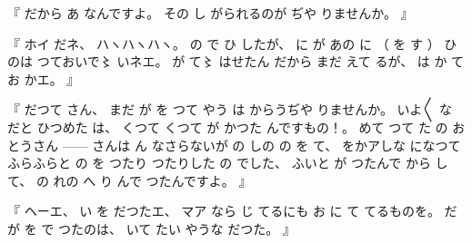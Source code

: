 %
『
だから
あ
なんですよ。
%
その
し
がられるのが
ぢや
りませんか。
』

%
『
ホイ
だネ、
%
ハヽハヽハヽ。
%
の
で
ひ
したが、
%
に
が
あの
に
（
を
す
）
ひのは
つておいで〻%
いネエ。
%
が
て〻%
はせたん
だから
まだ
えて%
るが、
%
は
か
て
お
かエ。
』

%
『
だつて
さん、
%
まだ
が
を
つて
やう
は
からうぢや
りませんか。
%
いよ〳〵
な
だと
ひつめた
は、
%
くつて
くつて
が
かつた
んですもの！。
%
めて
つて
た
の
おとうさん
{---}{---}
さんは
ん
なさらないが
の
しの
の
を
て、
%
をかアしな
になつて
ふらふらと%
の
を
つたり
つたりした
の
でした、
%
ふいと
が
つたんで
から
して、
%
の
れの
へ
り
んで
つたんですよ。
』

%
『
ヘーエ、
%
い
を
だつたエ、
%
マア
なら
じ
てるにも
お
に
て
てるものを。
%
だが
を
で
つたのは、
%
いて
たい
やうな
だつた。
』


